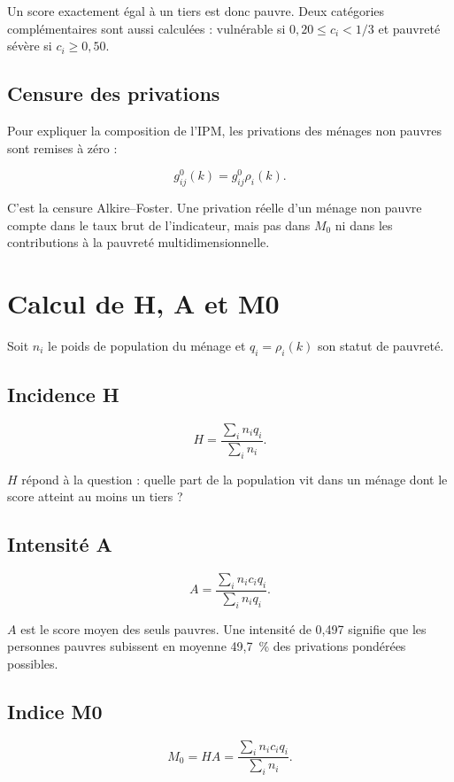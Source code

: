 \documentclass[11pt,a4paper]{article}
\begin{document}
Un score exactement égal à un tiers est donc pauvre. Deux catégories complémentaires sont aussi
calculées : vulnérable si $0,20 \leq c_i < 1/3$ et pauvreté sévère si $c_i \geq 0,50$.

\subsection{Censure des privations}

Pour expliquer la composition de l'IPM, les privations des ménages non pauvres sont remises à
zéro :

\[
  g^0_{ij}(k) = g^0_{ij}\rho_i(k).
\]

C'est la censure Alkire--Foster. Une privation réelle d'un ménage non pauvre compte dans le taux
brut de l'indicateur, mais pas dans $M_0$ ni dans les contributions à la pauvreté
multidimensionnelle.

\section{Calcul de H, A et M0}

Soit $n_i$ le poids de population du ménage et $q_i=\rho_i(k)$ son statut de pauvreté.

\subsection{Incidence H}

\[
  H = \frac{\sum_i n_i q_i}{\sum_i n_i}.
\]

$H$ répond à la question : quelle part de la population vit dans un ménage dont le score atteint
au moins un tiers ?

\subsection{Intensité A}

\[
  A = \frac{\sum_i n_i c_i q_i}{\sum_i n_i q_i}.
\]

$A$ est le score moyen des seuls pauvres. Une intensité de 0,497 signifie que les personnes
pauvres subissent en moyenne 49,7~\% des privations pondérées possibles.

\subsection{Indice M0}

\[
  M_0 = H A = \frac{\sum_i n_i c_i q_i}{\sum_i n_i}.
\]
\end{document}
